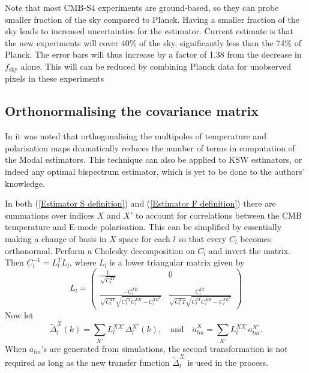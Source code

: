 Note that most CMB-S4 experiments are ground-based, so they can probe smaller fraction of the sky compared to Planck. Having a smaller fraction of the sky leads to  increased uncertainties for the estimator. Current estimate is that the new experiments will cover 40\% of the sky, significantly less than the 74\% of Planck. The error bars will thus increase by a factor of 1.38 from the decrease in $f_\text{sky}$ alone.  This will can be reduced by combining Planck data for unobserved pixels in these experiments

\subsection{Orthonormalising the covariance matrix}

In \cite{Fergusson2014} it was noted that orthogonalising the multipoles of temperature and polarisation maps dramatically reduces the number of terms in computation of the Modal estimators. This technique can also be applied to KSW estimators, or indeed any optimal bispectrum estimator, which is yet to be done to the authors' knowledge.

In both (\ref{Estimator S definition}) and (\ref{Estimator F definition}) there are summations over indices $X$ and $X'$ to account for correlations between the CMB temperature and E-mode polarisation. This can be simplified by essentially making a change of basis in $X$ space for each $l$ so that every $C_l$ becomes orthonormal. Perform a Cholesky decomposition on $C_l$ and invert the matrix. Then $C_l^{-1} = L_l^T L_l$, where $L_l$ is a lower triangular matrix given by
\begin{equation}
	L_l = \begin{pmatrix} \frac{1}{\sqrt{C_l^{TT}}} & 0  \\ \frac{- C_l^{TE}}{\sqrt{C_l^{TT}} \sqrt{C_l^{TT} C_l^{EE} - C_l^{TE^2}}}  &  \frac{ C_l^{TT}}{\sqrt{C_l^TT} \sqrt{C_l^{TT} C_l^{EE} - C_l^{TE^2}}} \end{pmatrix}
\end{equation}
Now let
\begin{equation}
	\tilde{\Delta}_{l}^X (k) = \sum_{X'} L_l^{XX'} \Delta_{l}^{X'} (k), \quad\text{and}\quad \tilde{a}_{lm}^X = \sum_{X'} L_l^{XX'} a_{lm}^{X'}.
	\label{orthonormalisation}
\end{equation}
When $a_{lm}$'s are generated from simulations, the second transformation is not required as long as the new transfer function $\tilde{\Delta}_l^X$ is used in the process.

